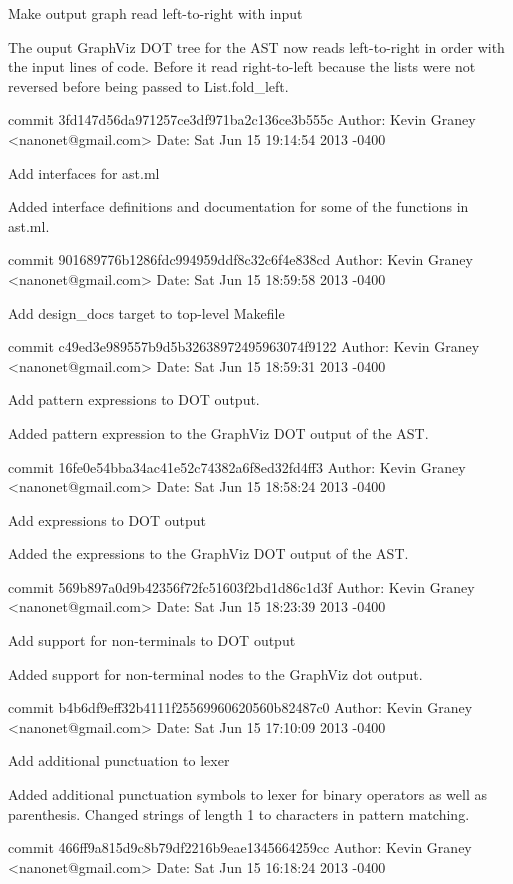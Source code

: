     Make output graph read left-to-right with input
    
    The ouput GraphViz DOT tree for the AST now reads left-to-right in
    order with the input lines of code.  Before it read right-to-left
    because the lists were not reversed before being passed to
    List.fold_left.

commit 3fd147d56da971257ce3df971ba2c136ce3b555c
Author: Kevin Graney <nanonet@gmail.com>
Date:   Sat Jun 15 19:14:54 2013 -0400

    Add interfaces for ast.ml
    
    Added interface definitions and documentation for some of the
    functions in ast.ml.

commit 901689776b1286fdc994959ddf8c32c6f4e838cd
Author: Kevin Graney <nanonet@gmail.com>
Date:   Sat Jun 15 18:59:58 2013 -0400

    Add design_docs target to top-level Makefile

commit c49ed3e989557b9d5b32638972495963074f9122
Author: Kevin Graney <nanonet@gmail.com>
Date:   Sat Jun 15 18:59:31 2013 -0400

    Add pattern expressions to DOT output.
    
    Added pattern expression to the GraphViz DOT output of the AST.

commit 16fe0e54bba34ac41e52c74382a6f8ed32fd4ff3
Author: Kevin Graney <nanonet@gmail.com>
Date:   Sat Jun 15 18:58:24 2013 -0400

    Add expressions to DOT output
    
    Added the expressions to the GraphViz DOT output of the AST.

commit 569b897a0d9b42356f72fc51603f2bd1d86c1d3f
Author: Kevin Graney <nanonet@gmail.com>
Date:   Sat Jun 15 18:23:39 2013 -0400

    Add support for non-terminals to DOT output
    
    Added support for non-terminal nodes to the GraphViz dot output.

commit b4b6df9eff32b4111f25569960620560b82487c0
Author: Kevin Graney <nanonet@gmail.com>
Date:   Sat Jun 15 17:10:09 2013 -0400

    Add additional punctuation to lexer
    
    Added additional punctuation symbols to lexer for binary operators
    as well as parenthesis.  Changed strings of length 1 to characters
    in pattern matching.

commit 466ff9a815d9c8b79df2216b9eae1345664259cc
Author: Kevin Graney <nanonet@gmail.com>
Date:   Sat Jun 15 16:18:24 2013 -0400

